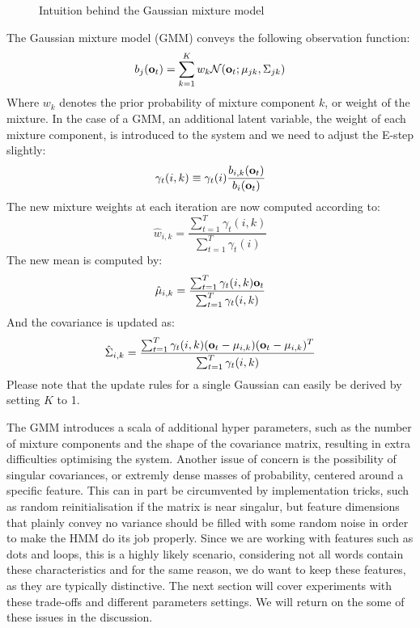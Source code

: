 \documentclass[conference]{IEEEtran}
\begin{document}
\begin{figure}[ht]
{    \label{fig:subfig2}
  }
  \label{fig:subfigureExample}
  \caption[Optional caption for list of figures]{Intuition behind the Gaussian mixture model}
\end{figure}
The Gaussian mixture model (GMM) conveys the following observation function:
\begin{equation}
\label{MOGprobability}
 b_{j}({\bf o}_{t}) = \displaystyle \sum_{k = 1}^K w_{k} \mathcal{N}({\bf o}_{t}; \mu_{jk}, \Sigma_{jk})
\end{equation}
Where $w_{k}$ denotes the prior probability of mixture component $k$, or weight of the mixture. In the case of a GMM, an additional latent variable, the weight of each mixture component, is introduced to the system and we need to adjust the E-step slightly:
\begin{equation}
 \gamma_{t}(i,k) \equiv \gamma_{t}(i) \frac{ b_{i,k}({\bf o}_{t}) } { b_{i}({\bf o}_{t}) }
\end{equation}
The new mixture weights at each iteration are now computed according to:
\begin{equation}
 \label{updateWeightGMM}
 \hat{w}_{i,k} = \displaystyle \frac{\sum_{t=1}^{T} \gamma_{t}(i,k) }{ \sum_{t=1}^{T} \gamma_{t}(i) }
\end{equation}
The new mean is computed by:
\begin{equation}
 \label{updateMeanGMM}
 \hat{\bf{\mu}}_{i,k} = \displaystyle \frac{ \sum_{t=1}^{T} \gamma_{t}(i,k) {\bf o}_{t} }{ \sum_{t=1}^{T} \gamma_{t}(i,k) }
\end{equation}
And the covariance is updated as:
\begin{equation}
 \label{updateCovarianceGMM}
 \hat{\Sigma}_{i,k} = \displaystyle \frac{ \sum_{t=1}^{T} \gamma_{t}(i,k) ({\bf o}_{t} - {\bf \mu}_{i,k})( {\bf o}_{t} - {\bf \mu}_{i,k} )^{T} }{ \sum_{t=1}^{T} \gamma_{t}(i,k) }
\end{equation}
Please note that the update rules for a single Gaussian can easily be derived by setting $K$ to 1. 

The GMM introduces a scala of additional hyper parameters, such as the number of mixture components and the shape of the covariance matrix, resulting in extra difficulties optimising the system. Another issue of concern is the possibility of singular covariances, or extremly dense masses of probability, centered around a specific feature. This can in part be circumvented by implementation tricks, such as random reinitialisation if the matrix is near singalur, but feature dimensions that plainly convey no variance should be filled with some random noise in order to make the HMM do its job properly. Since we are working with features such as dots and loops, this is a highly likely scenario, considering not all words contain these characteristics and for the same reason, we do want to keep these features, as they are typically distinctive. The next section will cover experiments with these trade-offs and different parameters settings. We will return on the some of these issues in the discussion.
\end{document}
